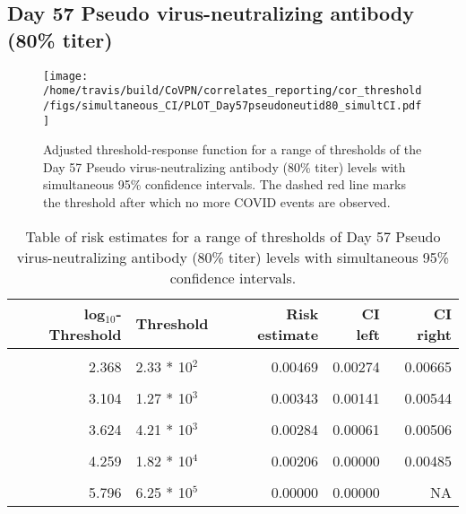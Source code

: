 \documentclass[]{book}
\theoremstyle{definition}
\theoremstyle{definition}
\theoremstyle{definition}
\newcommand{\1}{\mathbbm{1}}
\begin{document}
\clearpage

\clearpage

\clearpage

\hypertarget{day-57-pseudo-virus-neutralizing-antibody-80-titer-2}{%
\subsection{Day 57 Pseudo virus-neutralizing antibody (80\% titer)}\label{day-57-pseudo-virus-neutralizing-antibody-80-titer-2}}

\begin{figure}[H]
\centering
\texttt{[image: /home/travis/build/CoVPN/correlates\_reporting/cor\_threshold/figs/simultaneous\_CI/PLOT\_Day57pseudoneutid80\_simultCI.pdf]}
\caption{Adjusted threshold-response function for a range of thresholds of the
  Day 57 Pseudo virus-neutralizing antibody (80\% titer) levels with simultaneous 95\% confidence intervals. The dashed red line marks the threshold after which no more COVID events are observed. }
\end{figure}
\begin{table}[!h]

\caption{\label{tab:unnamed-chunk-385}Table of risk estimates for a range of thresholds of Day 57 Pseudo virus-neutralizing antibody (80\% titer) levels with simultaneous 95\% confidence intervals.}
\centering
\begin{tabular}[t]{rlrrr}
\toprule
log$_{10}$-Threshold & Threshold & Risk estimate & CI left & CI right\\
\midrule
\cellcolor{gray!6}{1.289} & \cellcolor{gray!6}{1.95 * 10$^1$} & \cellcolor{gray!6}{0.00514} & \cellcolor{gray!6}{0.00323} & \cellcolor{gray!6}{0.00706}\\
2.368 & 2.33 * 10$^2$ & 0.00469 & 0.00274 & 0.00665\\
\cellcolor{gray!6}{2.755} & \cellcolor{gray!6}{5.69 * 10$^2$} & \cellcolor{gray!6}{0.00428} & \cellcolor{gray!6}{0.00229} & \cellcolor{gray!6}{0.00626}\\
3.104 & 1.27 * 10$^3$ & 0.00343 & 0.00141 & 0.00544\\
\cellcolor{gray!6}{3.373} & \cellcolor{gray!6}{2.36 * 10$^3$} & \cellcolor{gray!6}{0.00310} & \cellcolor{gray!6}{0.00107} & \cellcolor{gray!6}{0.00514}\\
3.624 & 4.21 * 10$^3$ & 0.00284 & 0.00061 & 0.00506\\
\cellcolor{gray!6}{3.909} & \cellcolor{gray!6}{8.11 * 10$^3$} & \cellcolor{gray!6}{0.00244} & \cellcolor{gray!6}{0.00015} & \cellcolor{gray!6}{0.00474}\\
4.259 & 1.82 * 10$^4$ & 0.00206 & 0.00000 & 0.00485\\
\cellcolor{gray!6}{4.676} & \cellcolor{gray!6}{4.74 * 10$^4$} & \cellcolor{gray!6}{0.00256} & \cellcolor{gray!6}{0.00000} & \cellcolor{gray!6}{0.00705}\\
5.796 & 6.25 * 10$^5$ & 0.00000 & 0.00000 & NA\\
\bottomrule
\end{tabular}
\end{table}
\end{document}
